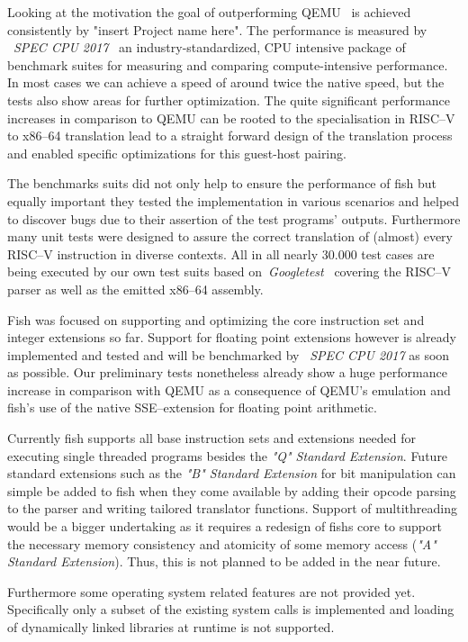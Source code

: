Looking at the motivation the goal of outperforming QEMU~\cite{bellard2005qemu} is achieved consistently by "insert Project name here".
The performance is measured by ~\textit{SPEC CPU 2017}~\cite{spec-cpu-2017} an industry-standardized, CPU intensive package of benchmark suites for measuring and comparing compute-intensive performance.
In most cases we can achieve a speed of around twice the native speed, but the tests also show areas for further optimization.
The quite significant performance increases in comparison to QEMU can be rooted to the specialisation in RISC--V to x86--64 translation lead to a straight forward design of the translation process and enabled specific optimizations for this guest-host pairing.

The benchmarks suits did not only help to ensure the performance of fish but equally important they tested the implementation in various scenarios and helped to discover bugs due to their assertion of the test programs' outputs.
Furthermore many unit tests were designed to assure the correct translation of (almost) every RISC--V instruction in diverse contexts.
All in all nearly 30.000 test cases are being executed by our own test suits based on~\textit{Googletest}~\cite{gtest} covering the RISC--V parser as well as the emitted x86--64 assembly.

Fish was focused on supporting and optimizing the core instruction set and integer extensions so far.
Support for floating point extensions however is already implemented and tested and will be benchmarked by ~\textit{SPEC CPU 2017} as soon as possible.
Our preliminary tests nonetheless already show a huge performance increase in comparison with QEMU as a consequence of QEMU's emulation and fish's use of the native SSE--extension for floating point arithmetic.


Currently fish supports all base instruction sets and extensions needed for executing single threaded programs besides the \textit{"Q" Standard Extension}.
Future standard extensions such as the \textit{"B" Standard Extension} for bit manipulation can simple be added to fish when they come available by adding their opcode parsing to the parser and writing tailored translator functions.
Support of multithreading would be a bigger undertaking as it requires a redesign of fishs core to support the necessary memory consistency and atomicity of some memory access (\textit{"A" Standard Extension}).
Thus, this is not planned to be added in the near future.

Furthermore some operating system related features are not provided yet.
Specifically only a subset of the existing system calls is implemented and loading of dynamically linked libraries at runtime is not supported.

